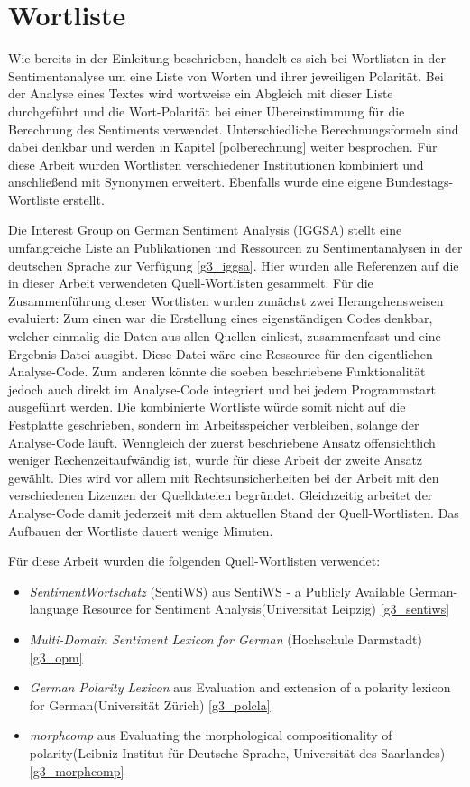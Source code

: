 \section{Wortliste}
\label{wortliste}
Wie bereits in der Einleitung beschrieben, handelt es sich bei Wortlisten in der Sentimentanalyse um eine Liste von Worten und ihrer jeweiligen Polarität. 
Bei der Analyse eines Textes wird wortweise ein Abgleich mit dieser Liste durchgeführt und die Wort-Polarität bei einer Übereinstimmung für die Berechnung des Sentiments verwendet. 
Unterschiedliche Berechnungsformeln sind dabei denkbar und werden in Kapitel \ref{polberechnung} weiter besprochen. 
Für diese Arbeit wurden Wortlisten verschiedener Institutionen kombiniert und anschließend mit Synonymen erweitert. 
Ebenfalls wurde eine eigene Bundestags-Wortliste erstellt. 

Die Interest Group on German Sentiment Analysis (IGGSA) stellt eine umfangreiche Liste an Publikationen und Ressourcen zu Sentimentanalysen in der deutschen Sprache zur Verfügung \ref{g3_iggsa}. 
Hier wurden alle Referenzen auf die in dieser Arbeit verwendeten Quell-Wortlisten gesammelt. 
Für die Zusammenführung dieser Wortlisten wurden zunächst zwei Herangehensweisen evaluiert: 
Zum einen war die Erstellung eines eigenständigen Codes denkbar, welcher einmalig die Daten aus allen Quellen einliest, zusammenfasst und eine Ergebnis-Datei ausgibt. 
Diese Datei wäre eine Ressource für den eigentlichen Analyse-Code. 
Zum anderen könnte die soeben beschriebene Funktionalität jedoch auch direkt im Analyse-Code integriert und bei jedem Programmstart ausgeführt werden. 
Die kombinierte Wortliste würde somit nicht auf die Festplatte geschrieben, sondern im Arbeitsspeicher verbleiben, solange der Analyse-Code läuft. 
Wenngleich der zuerst beschriebene Ansatz offensichtlich weniger Rechenzeitaufwändig ist, wurde für diese Arbeit der zweite Ansatz gewählt. 
Dies wird vor allem mit Rechtsunsicherheiten bei der Arbeit mit den verschiedenen Lizenzen der Quelldateien begründet. 
Gleichzeitig arbeitet der Analyse-Code damit jederzeit mit dem aktuellen Stand der Quell-Wortlisten. 
Das Aufbauen der Wortliste dauert wenige Minuten. 

Für diese Arbeit wurden die folgenden Quell-Wortlisten verwendet: 

\begin{itemize}
\item \textit{SentimentWortschatz} (SentiWS) aus \glqq SentiWS - a Publicly Available German-language Resource for Sentiment Analysis\grqq (Universität Leipzig) \ref{g3_sentiws}
\item \textit{Multi-Domain Sentiment Lexicon for German} (Hochschule Darmstadt) \ref{g3_opm}
\item \textit{German Polarity Lexicon} aus \glqq Evaluation and extension of a polarity lexicon for German\grqq (Universität Zürich) \ref{g3_polcla}
\item \textit{morphcomp} aus \glqq Evaluating the morphological compositionality of polarity\grqq (Leibniz-Institut für Deutsche Sprache, Universität des Saarlandes) \ref{g3_morphcomp}
\end{itemize}

